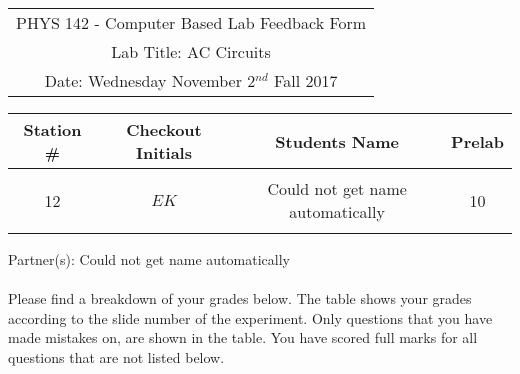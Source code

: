 \documentclass{article}
\begin{document}

\clearpage\begin{table}[h]
	\centering
	\begin{tabular}{c}
	PHYS 142 - Computer Based Lab Feedback Form\\
	Lab Title: AC Circuits\\Date: Wednesday November 2$^{nd}$ Fall 2017 \\\hline
\end{tabular}
\end{table}
\begin{table}[h]\centering \begin{tabular}{|c|c|p{9.9 cm}|c|}\hline Station \#  & Checkout Initials & \multicolumn{1}{|c|}{Students Name} & Prelab \\\hline\multirow{3}{*}{12}& \multirow{3}{*}{$EK$} & &\\& &\multicolumn{1}{|c|}{Could not get name automatically}&10\\&   &  &\\\hline
\end{tabular}
\end{table}
Partner(s): Could not get name automatically\\
\\Please find a breakdown of your grades below. The table shows your grades according to the slide number of the experiment. Only questions that you have made mistakes on, are shown in the table. You have scored full marks for all questions that are not listed below.
\end{document}

